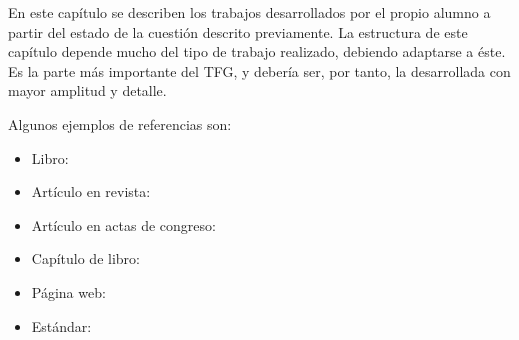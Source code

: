 En este capítulo se describen los trabajos desarrollados por el propio alumno a partir del estado de la cuestión descrito previamente. La estructura de este capítulo depende mucho del tipo de trabajo realizado, debiendo adaptarse a éste. Es la parte más importante del TFG, y debería ser, por tanto, la desarrollada con mayor amplitud y detalle.


Algunos ejemplos de referencias son:

\begin{itemize}
\item Libro: \parencite{ASdV:2023}
\item Artículo en revista: \parencite{JLP:2011}
\item Artículo en actas de congreso: \parencite{OCC:2023}
\item Capítulo de libro: \parencite{Micciancio:2009:LBC}
\item Página web: \parencite{U-tad:2023}
\item Estándar: \parencite{NIST:2020}
\end{itemize}


